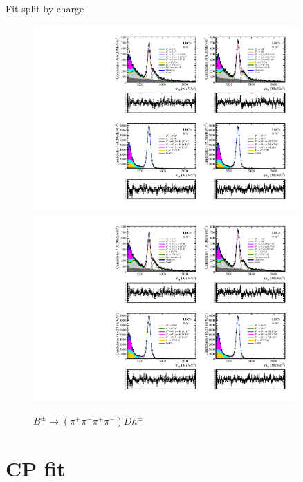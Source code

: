 \documentclass{beamer}
\begin{document}
\begin{frame}{Fit split by charge}
  \begin{figure}
    \centering
    \includegraphics[width = 0.9\textwidth, clip = true, trim = {0 12.9cm 0 0}]{Plots/d2pipipipi_fiveL_allDP_GLW.pdf}
    \includegraphics[width = 0.9\textwidth, clip = true, trim = {0 3cm 0 10cm}]{Plots/d2pipipipi_fiveL_allDP_GLW.pdf}
    \caption{$B^\pm\to (\pi^+\pi^-\pi^+\pi^-)Dh^\pm$}
  \end{figure}
\end{frame}

\section{CP fit}
\end{document}
